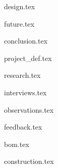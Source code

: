 \documentclass{book}
\begin{document}
{design.tex}

{future.tex}

{conclusion.tex}

\appendix

{project_def.tex}

{research.tex}

{interviews.tex}

{observations.tex}

{feedback.tex}

{bom.tex}

{construction.tex}

\backmatter
\end{document}
